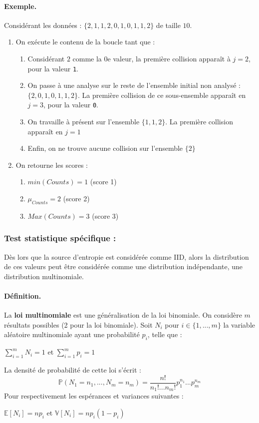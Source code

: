 \paragraph{Exemple.\\}
Considérant les données : $ \lbrace 2, 1, 1, 2, 0, 1, 0, 1, 1, 2 \rbrace$ de taille $10$.
\begin{enumerate}
\item On exécute le contenu de la boucle tant que : 
	\begin{enumerate}
	\item Considérant $2$ comme la $0$e valeur, la première collision apparaît à $j=2$, pour la valeur \texttt{1}.
	\item On passe à une analyse sur le reste de l'ensemble initial non analysé : $ \lbrace 2, 0, 1, 0, 1, 1, 2 \rbrace$. La première collision de ce sous-ensemble apparaît en $j=3$, pour la valeur \texttt{0}.
	\item On travaille à présent sur l'ensemble $ \lbrace 1, 1, 2 \rbrace$. La première collision apparaît en $j=1$
	\item Enfin, on ne trouve aucune collision sur l'ensemble $\lbrace 2 \rbrace $
	\end{enumerate}
\item On retourne les scores : 
	\begin{enumerate}
	\item $min(Counts) = 1$ (score 1)
	\item $\mu_{Counts} = 2$ (score 2)
	\item $Max(Counts) = 3$ (score 3)
	\end{enumerate}

\end{enumerate}

\subsubsection{Test statistique spécifique : \chidpdf}
Dès lors que la source d'entropie est considérée comme IID, alors la distribution de ces valeurs peut être considérée comme une distribution indépendante, une distribution multinomiale.

\paragraph{Définition.\\}
La \textbf{loi multinomiale} est une généralisation de la loi binomiale. On considère $m$ résultats possibles (2 pour la loi binomiale). Soit $N_i$ pour $i \in \lbrace1,...,m\rbrace$ la variable aléatoire multinomiale ayant une probabilité $p_i$, telle que :
\begin{center}
$ \sum \limits_{i=1}^{m} N_i = 1$ et $\sum \limits_{i=1}^{m} p_i = 1$ 
\end{center}
La densité de probabilité de cette loi s'écrit : 
$$ \mathbb{P}(N_1=n_1, ..., N_m = n_m) = \frac{n!}{n_1! ... n_m!}p_1^{n_1}...p_m^{n_m}$$
Pour respectivement les espérances et variances suivantes :
\begin{center}
$ \mathbb{E}[N_i]=np_i$ et $\mathbb{V}[N_i]=np_i(1-p_i)$
\end{center}

